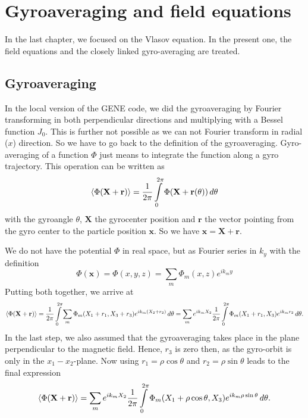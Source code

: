 \chapter{Gyroaveraging and field equations}
\label{chap:numerics}
In the last chapter, we focused on the Vlasov equation. In the present
one, the field equations and the closely linked gyro-averaging are
treated. 



\section{Gyroaveraging}
\label{sec:gyroaveraging}

In the local version of the GENE code, we did the gyroaveraging by
Fourier transforming in both perpendicular directions and multiplying
with a Bessel function $J_0$. This is further not possible 
as we can not Fourier transform in radial ($x$) direction. So we have
to go back to the definition of the gyroaveraging. Gyro-averaging of a
function $\Phi$ just means to integrate the function along a gyro
trajectory. This operation can be written as
\begin{eqnarray*}
  \left\langle \Phi(\mathbf{X}+\mathbf{r}) \right\rangle 
  = \frac{1}{2\pi}\int\limits_0^{2\pi} \Phi(\mathbf{X}+\mathbf{r}(\theta))\,d\theta
\end{eqnarray*}
with the gyroangle $\theta$, $\mathbf{X}$ the gyrocenter position and
$\mathbf{r}$ the vector pointing from the gyro center to the particle
position $\mathbf{x}$. So we have $\mathbf{x}=\mathbf{X}+\mathbf{r}$. 

We do not have the potential $\Phi$ in real space, but as Fourier
series in $k_y$ with the definition
\begin{displaymath}
  \Phi(\mathbf{x}) = \Phi(x,y,z) = \sum_m \Phi_m(x,z) e^{ik_m y}
\end{displaymath}
Putting both together, we arrive at
\begin{displaymath}
  \left\langle \Phi(\mathbf{X}+\mathbf{r}) \right\rangle 
  = \frac{1}{2\pi}\int\limits_0^{2\pi} \sum_m
  \Phi_m(X_1+r_1,X_3+r_3) e^{ik_m(X_2+r_2)}\,d\theta
  = \sum_m e^{ik_mX_2} \frac{1}{2\pi}\int\limits_0^{2\pi}
  \Phi_m(X_1+r_1,X_3) e^{ik_m r_2}\,d\theta.
\end{displaymath}
In the last step, we also assumed that the gyroaveraging takes place
in the plane perpendicular to the magnetic field. Hence, $r_3$ is zero
then, as the gyro-orbit is only in the $x_1-x_2$-plane.
Now using $r_1 = \rho\cos\theta$ and $r_2=\rho\sin\theta$ leads to the
final expression
\begin{displaymath}
  \left\langle \Phi(\mathbf{X}+\mathbf{r}) \right\rangle 
  = \sum_m e^{ik_mX_2} \frac{1}{2\pi}\int\limits_0^{2\pi}
  \Phi_m(X_1+\rho\cos\theta,X_3) e^{ik_m \rho\sin\theta}\,d\theta.
\end{displaymath}

